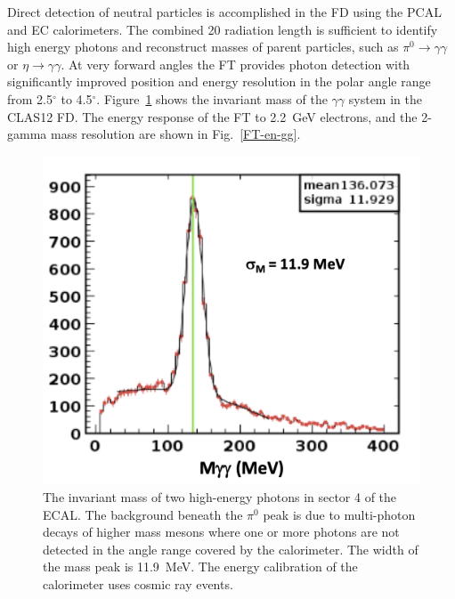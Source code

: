 \documentclass[final,3p,twocolumn]{elsarticle}
\begin{document}
Direct detection of neutral particles is accomplished in the FD using the PCAL and EC calorimeters. The combined
20 radiation length is sufficient to identify high energy photons and reconstruct masses of parent particles, such
as $\pi^0\to \gamma \gamma$  or $\eta \to \gamma \gamma$. At very forward angles the FT provides photon
detection with significantly improved position and energy resolution in the polar angle range from 2.5$^\circ$ to
4.5$^\circ$. Figure~\ref{gg-ecal} shows the invariant mass of the $\gamma\gamma$ system in the CLAS12 FD.
The energy response of the FT to 2.2~GeV electrons, and the 2-gamma mass resolution are shown in
Fig.~\ref{FT-en-gg}. 

\begin{figure}[tp!]
\centerline{\includegraphics[width=0.95\columnwidth]{ECAL-2g-mass-fit.png}}
\caption{The invariant mass of two high-energy photons in sector 4 of the ECAL. The background beneath the
  $\pi^0$ peak is due to multi-photon decays of higher mass mesons where one or more photons are not detected
  in the angle range covered by the calorimeter. The width of the mass peak is 11.9~MeV. The energy calibration
  of the calorimeter uses cosmic ray events.}
\label{gg-ecal}

\end{figure}
\end{document}
